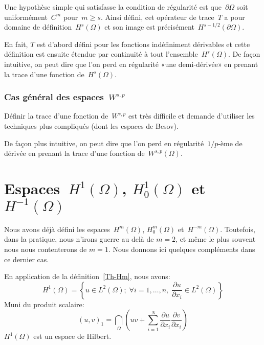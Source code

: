 Une hypothèse simple qui satisfasse la condition de régularité est que~$\partial \Omega$ soit uniformément~$C^m$ pour~$m \geqslant s$.
Ainsi défini, cet opérateur de trace~$T$ a pour domaine de définition~$H^s(\Omega)$ et son image est précisément~$H^{s-1/2}(\partial \Omega)$.

En fait, $T$ est d'abord défini pour les fonctions indéfiniment dérivables et cette définition est ensuite étendue par continuité à tout l'ensemble~$H^s(\Omega)$.
De façon intuitive, on peut dire que l'on perd en régularité «une demi-dérivée» en prenant la trace d'une fonction de~$H^s(\Omega)$.


\medskip
\subsubsection{Cas général des espaces~$W^{s,p}$}

Définir la trace d'une fonction de~$W^{s,p}$ est très difficile et demande d'utiliser les techniques plus compliqués (dont les espaces de Besov).

De façon plus intuitive, on peut dire que l'on perd en régularité~$1/p$-ème de dérivée en prenant la trace d'une fonction de~$W^{s,p}(\Omega)$.



\medskip
\section{Espaces~$H^1(\Omega)$, $H^1_0(\Omega)$ et~$H^{-1}(\Omega)$}

Nous avons déjà défini les espaces~$H^m(\Omega)$, $H^m_0(\Omega)$ et~$H^{-m}(\Omega)$.
Toutefois, dans la pratique, nous n'irons guerre au delà de $m=2$, et même le plus souvent nous nous contenterons de $m=1$. Nous donnons ici quelques compléments dans ce dernier cas.

\medskip
En application de la définition~\ref{Th-Hm}, nous avons:
\begin{equation}
H^1(\Omega)=\left\lbrace u\in L^2(\Omega);\; \forall i =1,\ldots,n,\; \frac{\partial u}{\partial x_i}\in L^2(\Omega) \right\rbrace
\end{equation}
Muni du produit scalaire:
\begin{equation}(u,v)_1 = \dint_{\Omega} \left(uv + \sum_{i=1}^N \frac{\partial u}{\partial x_i} \frac{\partial v}{\partial x_i} \right )
\end{equation}
$H^1(\Omega)$ est un espace de Hilbert.

